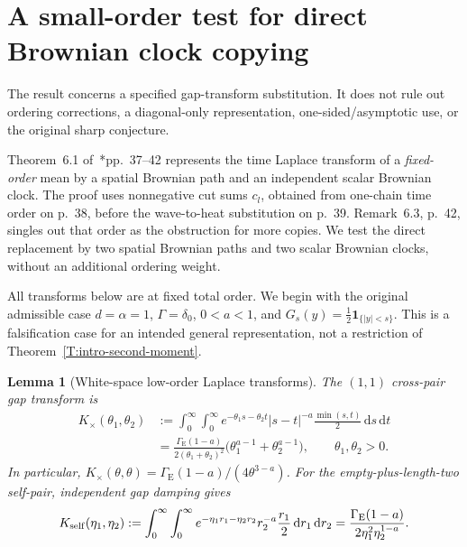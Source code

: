 \documentclass[12pt,oneside,openany]{book}
\makeatletter
\let\lean@pending\@empty
\newcommand{\LeanMarker}[1]{\gdef\lean@pending{#1}}
\numberwithin{equation}{section}
\newtheorem{lemma}[theorem]{Lemma}
\theoremstyle{nogostyle}
\theoremstyle{definition}
\newcommand{\ud}{\,\mathrm{d}}
\makeatother
\begin{document}
\section{A small-order test for direct Brownian clock copying}
\label{S:two-clock-screen}

The result concerns a specified gap-transform substitution. It does not rule out
ordering corrections, a diagonal-only representation, one-sided/asymptotic use,
or the original sharp conjecture.

Theorem~6.1 of~\cite{chen:author2026:time-dependency}*{pp.~37--42} represents
the time Laplace transform of a \emph{fixed-order} mean by a spatial Brownian
path and an independent scalar Brownian clock. The proof uses nonnegative cut
sums \(c_l\), obtained from one-chain time order on p.~38, before the
wave-to-heat substitution on p.~39. Remark~6.3, p.~42, singles out that order as
the obstruction for more copies. We test the direct replacement by two spatial
Brownian paths and two scalar Brownian clocks, without an additional ordering
weight.

All transforms below are at fixed total order. We begin with the original
admissible case \(d=\alpha=1\), \(\Gamma=\delta_0\), \(0<a<1\), and
\(G_s(y)=\frac12\mathbf1_{\{|y|<s\}}\). This is a falsification case for an
intended general representation, not a restriction of Theorem~\ref{T:intro-second-moment}.

\LeanMarker{L:white-clock-laplace}
\begin{lemma}[White-space low-order Laplace transforms]
  \label{L:white-clock-laplace}
  The \((1,1)\) cross-pair gap transform is
  \begin{equation}\label{E:white-cross-clock-transform}
    \begin{split}
      K_\times(\theta_1,\theta_2)
      &:=\int_0^\infty\int_0^\infty
      e^{-\theta_1s-\theta_2t}|s-t|^{-a}
      \frac{\min(s,t)}2\ud s\ud t\\
      &=\frac{\Gamma_{\mathrm{E}}(1-a)}
      {2(\theta_1+\theta_2)^2}
      \big(\theta_1^{a-1}+\theta_2^{a-1}\big),
      \qquad \theta_1,\theta_2>0.
    \end{split}
  \end{equation}
  In particular, \(K_\times(\theta,\theta)=
  \Gamma_{\mathrm{E}}(1-a)/(4\theta^{3-a})\). For the empty-plus-length-two
  self-pair, independent gap damping gives
  \begin{equation}\label{E:white-self-clock-transform}
    K_{\rm self}(\eta_1,\eta_2)
    :=\int_0^\infty\int_0^\infty
    e^{-\eta_1r_1-\eta_2r_2}r_2^{-a}\frac{r_1}2
    \ud r_1\ud r_2
    =\frac{\Gamma_{\mathrm{E}}(1-a)}
    {2\eta_1^2\eta_2^{1-a}}.
  \end{equation}
\end{lemma}
\end{document}
